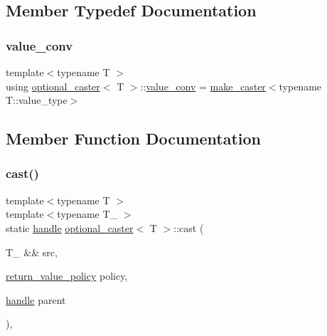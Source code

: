 \subsection{Member Typedef Documentation}
\mbox{\label{structoptional__caster_a14811a7fbc6e8b1c68461474469979b1}} 
\subsubsection{\texorpdfstring{value\_conv}{value\_conv}}
{\footnotesize\ttfamily template$<$typename T $>$ \\
using \mbox{\hyperlink{structoptional__caster}{optional\+\_\+caster}}$<$ T $>$\+::\mbox{\hyperlink{structoptional__caster_a14811a7fbc6e8b1c68461474469979b1}{value\+\_\+conv}} =  \mbox{\hyperlink{cast_8h_ab32b52411a6b07420516d79074815713}{make\+\_\+caster}}$<$typename T\+::value\+\_\+type$>$}



\subsection{Member Function Documentation}
\mbox{\label{structoptional__caster_a6037ba36e2d38d203e038c341e74fa23}} 
\subsubsection{\texorpdfstring{cast()}{cast()}}
{\footnotesize\ttfamily template$<$typename T $>$ \\
template$<$typename T\+\_\+ $>$ \\
static \mbox{\hyperlink{classhandle}{handle}} \mbox{\hyperlink{structoptional__caster}{optional\+\_\+caster}}$<$ T $>$\+::cast (\begin{DoxyParamCaption}\item[{T\+\_\+ \&\&}]{src,  }\item[{\mbox{\hyperlink{detail_2common_8h_adde72ab1fb0dd4b48a5232c349a53841}{return\+\_\+value\+\_\+policy}}}]{policy,  }\item[{\mbox{\hyperlink{classhandle}{handle}}}]{parent }\end{DoxyParamCaption})\hspace{0.3cm}{\ttfamily [inline]}, {\ttfamily [static]}}

